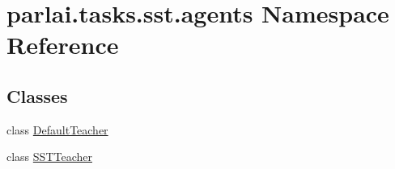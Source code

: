 \hypertarget{namespaceparlai_1_1tasks_1_1sst_1_1agents}{}\section{parlai.\+tasks.\+sst.\+agents Namespace Reference}
\label{namespaceparlai_1_1tasks_1_1sst_1_1agents}
\subsection*{Classes}
\begin{DoxyCompactItemize}
\item 
class \hyperlink{classparlai_1_1tasks_1_1sst_1_1agents_1_1DefaultTeacher}{Default\+Teacher}
\item 
class \hyperlink{classparlai_1_1tasks_1_1sst_1_1agents_1_1SSTTeacher}{S\+S\+T\+Teacher}
\end{DoxyCompactItemize}
